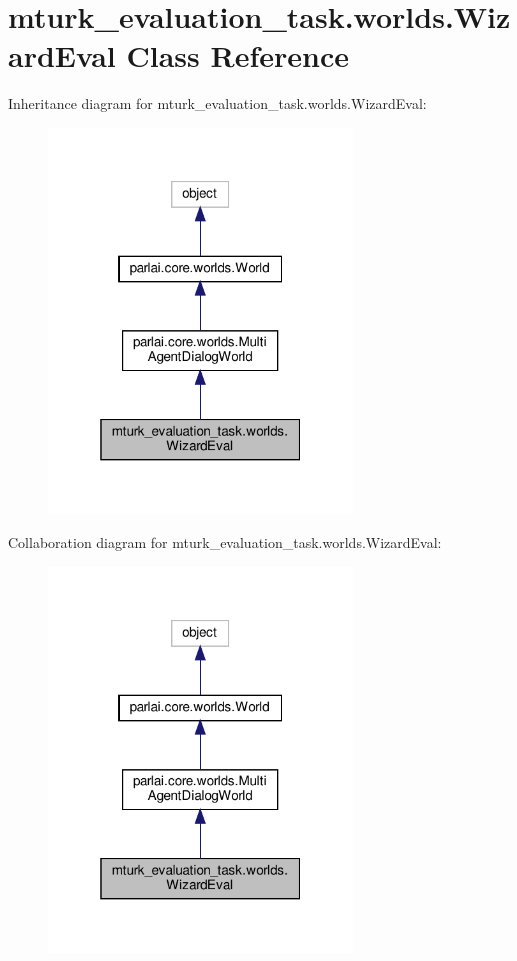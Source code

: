 \hypertarget{classmturk__evaluation__task_1_1worlds_1_1WizardEval}{}\section{mturk\+\_\+evaluation\+\_\+task.\+worlds.\+Wizard\+Eval Class Reference}
\label{classmturk__evaluation__task_1_1worlds_1_1WizardEval}


Inheritance diagram for mturk\+\_\+evaluation\+\_\+task.\+worlds.\+Wizard\+Eval\+:
\nopagebreak
\begin{figure}[H]
\begin{center}
\leavevmode
\includegraphics[width=229pt]{classmturk__evaluation__task_1_1worlds_1_1WizardEval__inherit__graph}
\end{center}
\end{figure}


Collaboration diagram for mturk\+\_\+evaluation\+\_\+task.\+worlds.\+Wizard\+Eval\+:
\nopagebreak
\begin{figure}[H]
\begin{center}
\leavevmode
\includegraphics[width=229pt]{classmturk__evaluation__task_1_1worlds_1_1WizardEval__coll__graph}
\end{center}
\end{figure}
